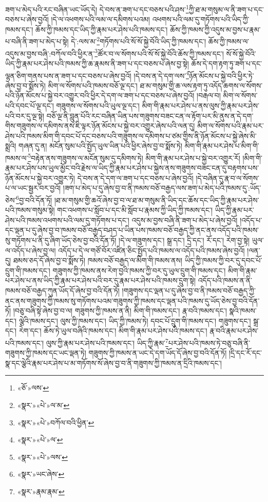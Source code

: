 ཟག་པ་མེད་པའི་རང་བཞིན་ཡང་ཡོད་དེ། དེ་བས་ན་ཟག་པ་དང་བཅས་པའི་ཤས་\footnote{«ཅོ་»ལས་}ཀྱི་ཐ་མ་གསུམ་ལ་ནི་ཟག་པ་དང་བཅས་པ་ཞེས་བྱའོ། །དེ་ལ་འཕགས་པའི་ལམ་ལ་དམིགས་པའམ། འཕགས་པའི་ལམ་དུ་གཏོགས་པའི་ཡིད་ཀྱི་ཁམས་དང་། ཆོས་ཀྱི་ཁམས་དང་ཡིད་ཀྱི་རྣམ་པར་ཤེས་པའི་ཁམས་དང་། ཆོས་ཀྱི་ཁམས་ཀྱི་འདུས་མ་བྱས་པ་རྣམ་པ་བཞི་ནི་ཟག་པ་མེད་པ་སྟེ། དེ་:ལས་མ་\footnote{«སྣར་»«པེ་»ལ་མ་}གཏོགས་པའི་སོ་སོ་སྐྱེ་བོའི་ཡིད་ཀྱི་ཁམས་དང་། ཆོས་ཀྱི་ཁམས་ལ་འདུས་མ་བྱས་བཞི་:བཀོལ་བའི་ཕྱིར་ན་\footnote{«སྣར་»«པེ་»བཀོལ་བའི་ཕྱིན་}ཚོར་བ་ལ་སོགས་པའི་སོ་སོ་སྐྱེ་བོའི་ཆོས་ཀྱི་ཁམས་དང་། སོ་སོ་སྐྱེ་བོའི་ཡིད་ཀྱི་རྣམ་པར་ཤེས་པའི་ཁམས་ཀྱི་ཆ་རྣམས་ནི་ཟག་པ་དང་བཅས་པ་ཞེས་བྱ་སྟེ། ཆོས་དེ་དག་རྟག་ཏུ་ཟག་པ་དང་ལྷན་ཅིག་གནས་པས་ན་ཟག་པ་དང་བཅས་པ་ཞེས་བྱའོ། །དེ་བས་ན་དེ་དག་ལས་\footnote{«སྣར་»«པེ་»ལ་}ཉོན་མོངས་པ་སྐྱེ་བའི་ཕྱིར་ཏེ་ཞེས་བྱ་བ་སྨོས་ཏེ། མིག་ལ་སོགས་པའི་ཁམས་བཅོ་ལྔ་དང་། ཐ་མ་གསུམ་གྱི་ཆ་ལས་རྟག་ཏུ་འདོད་ཆགས་ལ་སོགས་པའི་ཉོན་མོངས་པ་སྐྱེ་བར་འགྱུར་བའི་ཕྱིར་དེ་དག་ལ་ཟག་པ་དང་བཅས་པ་ཞེས་བྱའོ། །བརྒལ་བ། མིག་ལ་སོགས་པའི་དབང་པོ་ལྔ་དང་། གཟུགས་ལ་སོགས་པའི་ཡུལ་ལྔ་དང་། མིག་གི་རྣམ་པར་ཤེས་པ་ནས་ལུས་ཀྱི་རྣམ་པར་ཤེས་པའི་བར་དུ་ལྔ་སྟེ། བཅོ་ལྔ་ནི་བླུན་པོའི་རང་བཞིན་ཡིན་པས་གཟུགས་བཟང་ངན་ལ་རྟོག་པར་མི་ནུས་ན་དེ་དག་གིས་གཟུགས་ལ་དམིགས་ནས་ཇི་ལྟར་ཉོན་མོངས་པ་སྐྱེ་བར་འགྱུར་ཞེས་པའི་ལན་དུ། མིག་ལ་སོགས་པའི་རྣམ་པར་ཤེས་པའི་ཁམས་མིག་གི་དབང་པོ་དང་བཅས་པའི་གཟུགས་ལ་དམིགས་པ་ཙམ་གྱིས་ནི་ཉོན་མོངས་པ་སྐྱེ་ཞེས་མི་སྨྲའི། གཞན་དུ་ན། མངོན་སུམ་པའི་སྤྱོད་ཡུལ་ཡིན་པའི་ཕྱིར་ཞེས་བྱ་བ་སྨོས་ཏེ། མིག་གི་རྣམ་པར་ཤེས་པ་མིག་གི་ཁམས་ལ་\footnote{«སྣར་»«པེ་»ལས་}བརྟེན་ནས་གཟུགས་ལ་མངོན་སུམ་དུ་དམིགས་ཏེ། མིག་གི་རྣམ་པར་ཤེས་པ་སྐྱེ་བར་འགྱུར་རོ། །མིག་གི་རྣམ་པར་ཤེས་པས་ཡུལ་མྱོང་བའི་རྗེས་ལ་ཡིད་ཀྱི་རྣམ་པར་ཤེས་པ་སྐྱེས་ནས་གཟུགས་བཟང་ངན་དུ་བརྟགས་པས་ཉོན་མོངས་པ་སྐྱེ་བར་འགྱུར་ཏེ། དེ་བས་ན་དེ་དག་ལ་ཟག་པ་དང་བཅས་པ་ཞེས་བྱའོ། །དེ་བཞིན་དུ་རྣ་བ་ལ་སོགས་པ་ལ་ཡང་སྦྱར་བར་བྱའོ། །ཟག་པ་མེད་པ་དུ་ཞེས་བྱ་བ་ནི་ཁམས་བཅོ་བརྒྱད་ལས་ཟག་པ་མེད་པའི་ཁམས་དུ་:ཡོད་ཅེས་\footnote{«སྣར་»ཡང་ཞེས་}བྱ་བའི་དོན་ཏོ། །ཐ་མ་གསུམ་གྱི་ཆའོ་ཞེས་བྱ་བ་ལ་ཐ་མ་གསུམ་ནི་ཡིད་དང་ཆོས་དང་ཡིད་ཀྱི་རྣམ་པར་ཤེས་པའི་ཁམས་གསུམ་སྟེ། གང་འཕགས་པ་སློབ་པ་དང་མི་སློབ་པ་རྣམས་ཀྱི་ཡིད་ཀྱི་ཁམས་དང་། ཡིད་ཀྱི་རྣམ་པར་ཤེས་པའི་ཁམས་འཕགས་པའི་ལམ་དུ་གཏོགས་པ་དང་། འདུས་མ་བྱས་བཞི་ནི་ཟག་པ་མེད་པ་ཞེས་བྱའོ། །འདོད་པ་དང་ལྡན་པ་དུ་ཞེས་བྱ་བ་ཁམས་བཅོ་བརྒྱད་བཤད་པ་ཡིན་པས་ཁམས་བཅོ་བརྒྱད་ཀྱི་ནང་ནས་འདོད་པའི་ཁམས་སུ་གཏོགས་པ་ནི་དུ་ཞིག་ཡོད་ཅེས་བྱ་བའི་དོན་ཏོ། །དེ་ལ་གཟུགས་དང་། སྒྲ་དང་། དྲི་དང་། རོ་དང་། རེག་བྱ་སྟེ། ཡུལ་ལ་འདོད་པ་ཞེས་བྱ་ལ། འདོད་པ་དེ་ལ་གཙོ་བོར་འཛིན་ཅིང་སྤྱོད་པའི་ཁམས་ལ་འདོད་པའི་ཁམས་ཞེས་བྱའོ། །ལན་དུ། ཐམས་ཅད་དོ་ཞེས་བྱ་བ་སྨོས་ཏེ། ཁམས་བཅོ་བརྒྱད་ལ་མིག་གི་ཁམས་ནས། ཡིད་ཀྱི་ཁམས་ཀྱི་བར་དུ་དབང་པོ་དྲུག་གི་ཁམས་དང་། གཟུགས་ཀྱི་ཁམས་ནས་རེག་བྱའི་ཁམས་ཀྱི་བར་དུ་ཡུལ་དྲུག་གི་ཁམས་དང་། མིག་གི་རྣམ་པར་ཤེས་པ་ནས་ཡིད་ཀྱི་རྣམ་པར་ཤེས་པའི་བར་དུ་རྣམ་པར་ཤེས་པའི་ཁམས་དྲུག་སྟེ། འདོད་པའི་ཁམས་ན་ནི་ཁམས་བཅོ་བརྒྱད་ཀུན་ཡོད་དོ་ཞེས་བྱ་བའི་དོན་ཏོ། །གཟུགས་དང་ལྡན་པ་དུ་ཞེས་བྱ་བ་ནི་ཁམས་བཅོ་བརྒྱད་ཀྱི་ནང་ནས་གཟུགས་ཀྱི་ཁམས་སུ་གཏོགས་པའམ་གཟུགས་ཀྱི་ཁམས་དང་ལྡན་པའི་ཁམས་དུ་ཡོད་ཅེས་བྱ་བའི་དོན་ཏོ། །བཅུ་བཞི་སྟེ་ཞེས་བྱ་བ་ལ། གཟུགས་ཀྱི་ཁམས་ན་ནི། མིག་གི་ཁམས་དང་། རྣ་བའི་ཁམས་དང་། སྣའི་ཁམས་དང་། ལྕེའི་ཁམས་དང་། ལུས་ཀྱི་ཁམས་དང་། ཡིད་ཀྱི་ཁམས་ཏེ། དབང་པོ་དྲུག་གི་ཁམས་དང་། གཟུགས་དང་། སྒྲ་དང་། རེག་དང་། ཆོས་ཏེ་ཡུལ་བཞིའི་ཁམས་དང་། མིག་གི་རྣམ་པར་ཤེས་པའི་ཁམས་དང་། རྣ་བའི་རྣམ་པར་ཤེས་པའི་ཁམས་དང་། ལུས་ཀྱི་རྣམ་པར་ཤེས་པའི་ཁམས་དང་། ཡིད་ཀྱི་རྣམ་\footnote{«སྣར་»རྣམ་རྣམ་}པར་ཤེས་པའི་ཁམས་ཏེ་བཅུ་བཞི་ནི་གཟུགས་ཀྱི་ཁམས་དང་ཡང་ལྡན་ཏེ། གཟུགས་ཀྱི་ཁམས་ན་ཡང་དེ་དག་ཡོད་དོ་ཞེས་བྱ་བའི་དོན་ཏོ། །དྲི་དང་རོ་དང་སྣ་དང་ལྕེའི་རྣམ་པར་ཤེས་པ་མ་གཏོགས་སོ་ཞེས་བྱ་བ་ནི་གཟུགས་ཀྱི་ཁམས་ན་དྲིའི་ཁམས་དང་། 